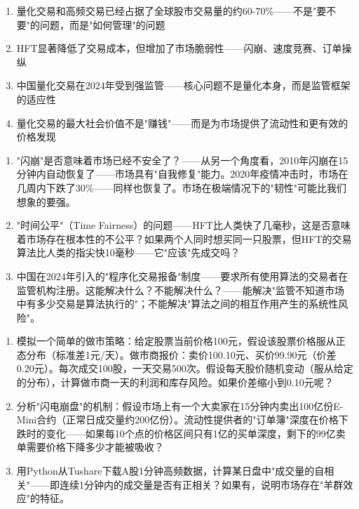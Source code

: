 \documentclass[a4paper,11pt]{ctexbook}
\begin{document}
\begin{lessonsummary}
\begin{enumerate}
  \item 量化交易和高频交易已经占据了全球股市交易量的约60-70\%——不是"要不要"的问题，而是"如何管理"的问题
  \item HFT显著降低了交易成本，但增加了市场脆弱性——闪崩、速度竞赛、订单操纵
  \item 中国量化交易在2024年受到强监管——核心问题不是量化本身，而是监管框架的适应性
  \item 量化交易的最大社会价值不是"赚钱"——而是为市场提供了流动性和更有效的价格发现
\end{enumerate}
\end{lessonsummary}

\begin{discuss}
\begin{enumerate}
  \item "闪崩"是否意味着市场已经不安全了？——从另一个角度看，2010年闪崩在15分钟内自动恢复了——市场具有"自我修复"能力。2020年疫情冲击时，市场在几周内下跌了30\%——同样也恢复了。市场在极端情况下的"韧性"可能比我们想象的要强。
  \item "时间公平"（Time Fairness）的问题——HFT比人类快了几毫秒，这是否意味着市场存在根本性的不公平？如果两个人同时想买同一只股票，但HFT的交易算法比人类的指尖快10毫秒——它"应该"先成交吗？
  \item 中国在2024年引入的"程序化交易报备"制度——要求所有使用算法的交易者在监管机构注册。这能解决什么？不能解决什么？——能解决"监管不知道市场中有多少交易是算法执行的"；不能解决"算法之间的相互作用产生的系统性风险"。
\end{enumerate}
\end{discuss}

\begin{exercises}
\begin{enumerate}
  \item 模拟一个简单的做市策略：给定股票当前价格100元，假设该股票价格服从正态分布（标准差1元/天）。做市商报价：卖价100.10元、买价99.90元（价差0.20元）。每次成交100股，一天交易500次。假设每天股价随机变动（服从给定的分布），计算做市商一天的利润和库存风险。如果价差缩小到0.10元呢？
  \item 分析"闪电崩盘"的机制：假设市场上有一个大卖家在15分钟内卖出100亿份E-Mini合约（正常日成交量约200亿份）。流动性提供者的"订单簿"深度在价格下跌时的变化——如果每10个点的价格区间只有1亿的买单深度，剩下的99亿卖单需要价格下降多少才能被吸收？
  \item 用Python从Tushare下载A股1分钟高频数据，计算某日盘中"成交量的自相关"——即连续1分钟内的成交量是否有正相关？如果有，说明市场存在"羊群效应"的特征。
\end{enumerate}
\end{exercises}
\end{document}
